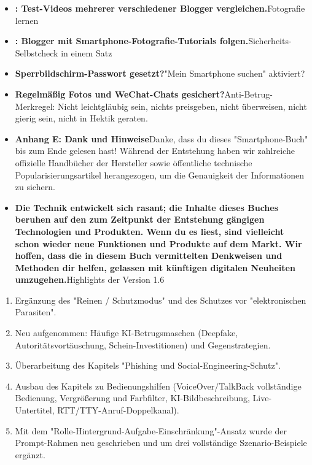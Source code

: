 

\begin{itemize}
  \item \textbf{: Test-Videos mehrerer verschiedener Blogger vergleichen.}Fotografie lernen
  \item \textbf{: Blogger mit Smartphone-Fotografie-Tutorials folgen.}Sicherheits-Selbstcheck in einem Satz
  \item \textbf{Sperrbildschirm-Passwort gesetzt?}"Mein Smartphone suchen" aktiviert?
\end{itemize}


\begin{itemize}
  \item \textbf{Regelmäßig Fotos und WeChat-Chats gesichert?}Anti-Betrug-Merkregel: Nicht leichtgläubig sein, nichts preisgeben, nicht überweisen, nicht gierig sein, nicht in Hektik geraten.
  \item \textbf{Anhang E: Dank und Hinweise}Danke, dass du dieses "Smartphone-Buch" bis zum Ende gelesen hast! Während der Entstehung haben wir zahlreiche offizielle Handbücher der Hersteller sowie öffentliche technische Popularisierungsartikel herangezogen, um die Genauigkeit der Informationen zu sichern.
  \item \textbf{Die Technik entwickelt sich rasant; die Inhalte dieses Buches beruhen auf den zum Zeitpunkt der Entstehung gängigen Technologien und Produkten. Wenn du es liest, sind vielleicht schon wieder neue Funktionen und Produkte auf dem Markt. Wir hoffen, dass die in diesem Buch vermittelten Denkweisen und Methoden dir helfen, gelassen mit künftigen digitalen Neuheiten umzugehen.}Highlights der Version 1.6
\end{itemize}


\begin{enumerate}
  \item Ergänzung des "Reinen / Schutzmodus" und des Schutzes vor "elektronischen Parasiten".
  \item Neu aufgenommen: Häufige KI-Betrugsmaschen (Deepfake, Autoritätsvortäuschung, Schein-Investitionen) und Gegenstrategien.
  \item Überarbeitung des Kapitels "Phishing und Social-Engineering-Schutz".
  \item Ausbau des Kapitels zu Bedienungshilfen (VoiceOver/TalkBack vollständige Bedienung, Vergrößerung und Farbfilter, KI-Bildbeschreibung, Live-Untertitel, RTT/TTY-Anruf-Doppelkanal).
  \item Mit dem "Rolle-Hintergrund-Aufgabe-Einschränkung"-Ansatz wurde der Prompt-Rahmen neu geschrieben und um drei vollständige Szenario-Beispiele ergänzt.
\end{enumerate}
